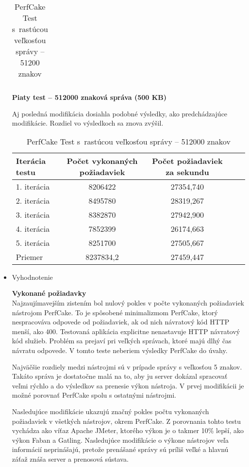 \documentclass[12pt,oneside,final]{fithesis-utf8}
\begin{document}
\begin{itemize}
\begin{table}[H]
\begin{center}
\begin{tabular}{ | l | c | c | c | c |}
\end{tabular}
\end{center}
\caption{PerfCake Test s~rastúcou veľkosťou správy -- 51200 znakov}
\end{table}


\textbf{Piaty test -- 512000 znaková správa (500 KB)}

Aj posledná modifikácia dosiahla podobné výsledky, ako predchádzajúce modifikácie. Rozdiel vo výsledkoch sa znova zvýšil.

\begin{table}[H]
\begin{center}
\begin{tabular}{ | l | c | c | c | c |}
		\hline
		 \textbf{Iterácia testu} & \textbf{Počet vykonaných požiadaviek} & \textbf{Počet požiadaviek za sekundu} \\ \hline
		 1. iterácia & 8206422 & 27354,740 \\ \hline
		 2. iterácia & 8495780 & 28319,267 \\ \hline
		 3. iterácia & 8382870 & 27942,900 \\ \hline
		 4. iterácia & 7852399 & 26174,663 \\ \hline
		 5. iterácia & 8251700 & 27505,667 \\ \hline
		 Priemer & 8237834,2 & 27459,447 \\ \hline
		 
\end{tabular}
\end{center}
\caption{PerfCake Test s~rastúcou veľkosťou správy -- 512000 znakov}
\end{table}


\item Vyhodnotenie

\textbf{Vykonané požiadavky}\\
Najzaujímavejším zistením bol nulový pokles v počte vykonaných požiadaviek nástrojom PerfCake. To je spôsobené minimalizmom PerfCake, ktorý nespracováva odpovede od požiadaviek, ak od nich návratový kód HTTP menší, ako 400. Testovaná aplikácia explicitne nenastavuje HTTP návratový kód služieb. Problém sa prejaví pri veľkých správach, ktoré majú dlhý čas návratu odpovede. V tomto teste neberiem výsledky PerfCake do úvahy.
\par Najväčšie rozdiely medzi nástrojmi sú v prípade správy s veľkosťou 5 znakov. Takáto správa je dostatočne malá na to, aby ju server dokázal spracovať veľmi rýchlo a do výsledkov sa prenesie výkon nástroja. V prvej modifikácii je možné porovnať PerfCake spolu s ostatnými nástrojmi.
\par Nasledujúce modifikácie ukazujú značný pokles počtu vykonaných požiadaviek v všetkých nástrojov, okrem PerfCake. Z porovnania tohto testu vychádza ako víťaz Apache JMeter, ktorého výkon je o takmer 10\% lepší, ako výkon Faban a Gatling. Nasledujúce modifikácie o výkone nástrojov veľa informácií neprinášajú, pretože prenášané správy sú príliš veľké a hlavnú záťaž znáša server a prenosová sústava.


\end{itemize}
\end{document}
